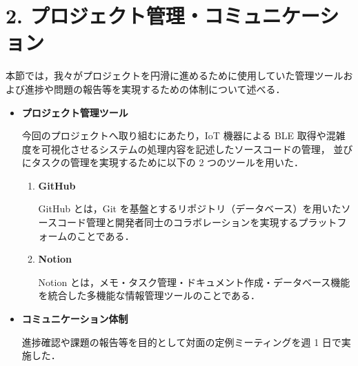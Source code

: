 \section*{2. プロジェクト管理・コミュニケーション}

本節では，我々がプロジェクトを円滑に進めるために使用していた管理ツールおよび進捗や問題の報告等を実現するための体制について述べる．
\begin{itemize}
	\item \textbf{プロジェクト管理ツール}
	
	今回のプロジェクトへ取り組むにあたり，IoT 機器による BLE 取得や混雑度を可視化させるシステムの処理内容を記述したソースコードの管理，
	並びにタスクの管理を実現するために以下の 2 つのツールを用いた．
	
	\begin{enumerate}
		\item \textbf{GitHub}
		
		GitHub とは，Git\cite{Git} を基盤とするリポジトリ（データベース）を用いたソースコード管理と開発者同士のコラボレーションを実現するプラットフォームのことである\cite{GitHub}．
		
		\item \textbf{Notion}
		
		Notion とは，メモ・タスク管理・ドキュメント作成・データベース機能を統合した多機能な情報管理ツールのことである\cite{Notion}．
		
	\end{enumerate}
	
	\item \textbf{コミュニケーション体制}
	
	進捗確認や課題の報告等を目的として対面の定例ミーティングを週 1 日で実施した．
\end{itemize}

